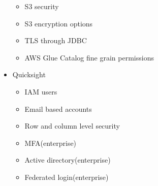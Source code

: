 \documentclass[../../main.tex]{subfiles}
\begin{document}
\begin{itemize}
\begin{itemize}
        \item S3 security
        \item S3 encryption options
        \item TLS through JDBC
        \item AWS Glue Catalog fine grain permissions
    \end{itemize}
    \item Quicksight
    \begin{itemize}
        \item IAM users
        \item Email based accounts
        \item Row and column level security
        \item MFA(enterprise)
        \item Active directory(enterprise)
        \item Federated login(enterprise)
    \end{itemize}
\end{itemize}
\end{document}
